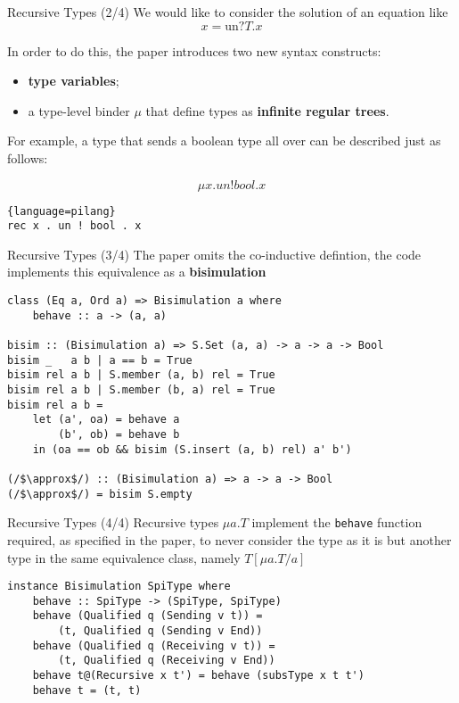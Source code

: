 \begin{frame}[fragile]{Recursive Types (2/4)}
    We would like to consider the solution of an equation like
    \[ x = \text{un}?T.x \]

    In order to do this, the paper introduces two new syntax constructs:
    \begin{itemize}
        \item \textbf{type variables};
        \item a type-level binder $\mu$ that define types as \textbf{infinite regular trees}.
    \end{itemize}

    For example, a type that sends a boolean type all over can be described just as follows:

    \begin{minipage}{0.45\textwidth}
    \[ \mu x . un!bool . x \]
    \end{minipage}
    \begin{minipage}{0.45\textwidth}
        \begin{lstlisting}{language=pilang}
rec x . un ! bool . x
        \end{lstlisting}
    \end{minipage}
\end{frame}

\begin{frame}[fragile]{Recursive Types (3/4)}
    The paper omits the co-inductive defintion, the code implements this equivalence as a \textbf{bisimulation}

    \scriptsize\begin{verbatim}
class (Eq a, Ord a) => Bisimulation a where
    behave :: a -> (a, a)

bisim :: (Bisimulation a) => S.Set (a, a) -> a -> a -> Bool
bisim _   a b | a == b = True
bisim rel a b | S.member (a, b) rel = True
bisim rel a b | S.member (b, a) rel = True
bisim rel a b =
    let (a', oa) = behave a
        (b', ob) = behave b
    in (oa == ob && bisim (S.insert (a, b) rel) a' b')

(/$\approx$/) :: (Bisimulation a) => a -> a -> Bool
(/$\approx$/) = bisim S.empty
    \end{verbatim}
    
\end{frame}

\begin{frame}[fragile]{Recursive Types (4/4)}
    Recursive types $\mu a.T$ implement the \texttt{behave} function required, as specified in the paper, to never consider the type as it is but another type in the same equivalence class, namely $T[\mu a.T/a]$

    \footnotesize\begin{verbatim}   
instance Bisimulation SpiType where
    behave :: SpiType -> (SpiType, SpiType)
    behave (Qualified q (Sending v t)) = 
        (t, Qualified q (Sending v End))
    behave (Qualified q (Receiving v t)) = 
        (t, Qualified q (Receiving v End))
    behave t@(Recursive x t') = behave (subsType x t t')
    behave t = (t, t)
    \end{verbatim}
\end{frame}

